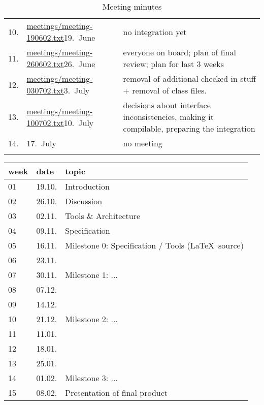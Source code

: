 \begin{table}[htbp]
\begin{tabular}[t]{r@{\quad}l@{\quad\quad}p{9cm}}
    10. 
    &
    \url{meetings/meeting-190602.txt}{19.\ June}
    &
    no integration yet
    \\
    11. 
    &
    \url{meetings/meeting-260602.txt}{26.\ June}
    &
    everyone on board; plan of final review;
    plan for last 3 weeks
    \\
    12. 
    &
    \url{meetings/meeting-030702.txt}{3.\ July}
    &
    removal of additional checked in stuff +
    removal of class files.
    \\
    13. 
    &
    \url{meetings/meeting-100702.txt}{10.\ July}
    &
    decisions about interface inconsistencies,
    making it compilable, 
    preparing the integration
    \\
    14. 
    &
    17.\ July
    &
    no meeting
    \\
\fi
  \end{tabular}
    \caption{Meeting minutes}
    \label{tab:meetings}
  \end{table}



\begin{tabular}{|l|l|l|}
\hline
week & date & topic 
\\\hline
01 & 19.10. & Introduction\\
02 & 26.10. & Discussion\\
03 & 02.11. & Tools \& Architecture\\
04 & 09.11. & Specification\\
05 & 16.11. & {Milestone 0}: Specification / Tools (\LaTeX\ source)\\
06 & 23.11. &\\
07 & 30.11. &  {Milestone 1:} ...\\
08 & 07.12. &\\
09 & 14.12. &\\
10 & 21.12. & Milestone 2: ...\\
11 & 11.01. &\\
12 & 18.01. &\\
13 & 25.01. &\\
14 & 01.02. & Milestone 3: ...\\
15 & 08.02. & Presentation of final product\\
\hline
\end{tabular}






